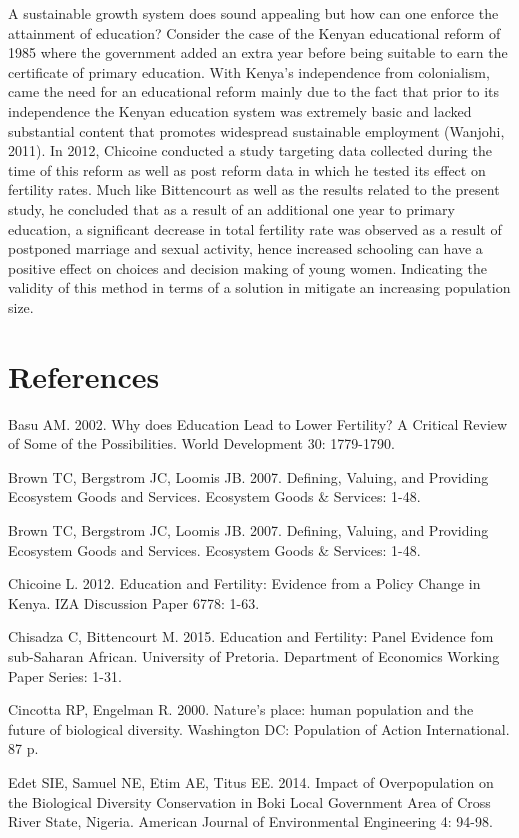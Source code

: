 \documentclass[11pt,]{article}
\begin{document}
A sustainable growth system does sound appealing but how can one enforce
the attainment of education? Consider the case of the Kenyan educational
reform of 1985 where the government added an extra year before being
suitable to earn the certificate of primary education. With Kenya's
independence from colonialism, came the need for an educational reform
mainly due to the fact that prior to its independence the Kenyan
education system was extremely basic and lacked substantial content that
promotes widespread sustainable employment (Wanjohi, 2011). In 2012,
Chicoine conducted a study targeting data collected during the time of
this reform as well as post reform data in which he tested its effect on
fertility rates. Much like Bittencourt as well as the results related to
the present study, he concluded that as a result of an additional one
year to primary education, a significant decrease in total fertility
rate was observed as a result of postponed marriage and sexual activity,
hence increased schooling can have a positive effect on choices and
decision making of young women. Indicating the validity of this method
in terms of a solution in mitigate an increasing population size.

\section{References}\label{references}

Basu AM. 2002. Why does Education Lead to Lower Fertility? A Critical
Review of Some of the Possibilities. World Development 30: 1779-1790.

Brown TC, Bergstrom JC, Loomis JB. 2007. Defining, Valuing, and
Providing Ecosystem Goods and Services. Ecosystem Goods \& Services:
1-48.

Brown TC, Bergstrom JC, Loomis JB. 2007. Defining, Valuing, and
Providing Ecosystem Goods and Services. Ecosystem Goods \& Services:
1-48.

Chicoine L. 2012. Education and Fertility: Evidence from a Policy Change
in Kenya. IZA Discussion Paper 6778: 1-63.

Chisadza C, Bittencourt M. 2015. Education and Fertility: Panel Evidence
fom sub-Saharan African. University of Pretoria. Department of Economics
Working Paper Series: 1-31.

Cincotta RP, Engelman R. 2000. Nature's place: human population and the
future of biological diversity. Washington DC: Population of Action
International. 87 p.

Edet SIE, Samuel NE, Etim AE, Titus EE. 2014. Impact of Overpopulation
on the Biological Diversity Conservation in Boki Local Government Area
of Cross River State, Nigeria. American Journal of Environmental
Engineering 4: 94-98.
\end{document}
